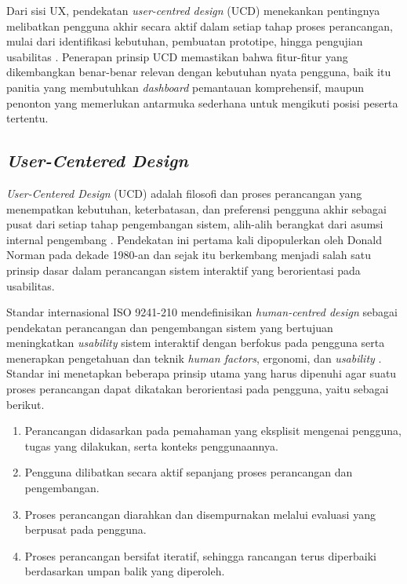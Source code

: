 Dari sisi UX, pendekatan \textit{user-centred design} (UCD) menekankan pentingnya melibatkan pengguna akhir secara aktif dalam setiap tahap proses perancangan, mulai dari identifikasi kebutuhan, pembuatan prototipe, hingga pengujian usabilitas \cite{maguire2001methods}. Penerapan prinsip UCD memastikan bahwa fitur-fitur yang dikembangkan benar-benar relevan dengan kebutuhan nyata pengguna, baik itu panitia yang membutuhkan \textit{dashboard} pemantauan komprehensif, maupun penonton yang memerlukan antarmuka sederhana untuk mengikuti posisi peserta tertentu.

\subsection{\textit{User-Centered Design}}
\textit{User-Centered Design} (UCD) adalah filosofi dan proses perancangan yang menempatkan kebutuhan, keterbatasan, dan preferensi pengguna akhir sebagai pusat dari setiap tahap pengembangan sistem, alih-alih berangkat dari asumsi internal pengembang \cite{norman1986}. Pendekatan ini pertama kali dipopulerkan oleh Donald Norman pada dekade 1980-an dan sejak itu berkembang menjadi salah satu prinsip dasar dalam perancangan sistem interaktif yang berorientasi pada usabilitas.
 
Standar internasional ISO 9241-210 mendefinisikan \textit{human-centred design} sebagai pendekatan perancangan dan pengembangan sistem yang bertujuan meningkatkan \textit{usability} sistem interaktif dengan berfokus pada pengguna serta menerapkan pengetahuan dan teknik \textit{human factors}, ergonomi, dan \textit{usability} \cite{iso92412102019}. Standar ini menetapkan beberapa prinsip utama yang harus dipenuhi agar suatu proses perancangan dapat dikatakan berorientasi pada pengguna, yaitu sebagai berikut.

\begin{enumerate}
\item Perancangan didasarkan pada pemahaman yang eksplisit mengenai pengguna, tugas yang dilakukan, serta konteks penggunaannya.
\item Pengguna dilibatkan secara aktif sepanjang proses perancangan dan pengembangan.
\item Proses perancangan diarahkan dan disempurnakan melalui evaluasi yang berpusat pada pengguna.
\item Proses perancangan bersifat iteratif, sehingga rancangan terus diperbaiki berdasarkan umpan balik yang diperoleh.
\end{enumerate}

